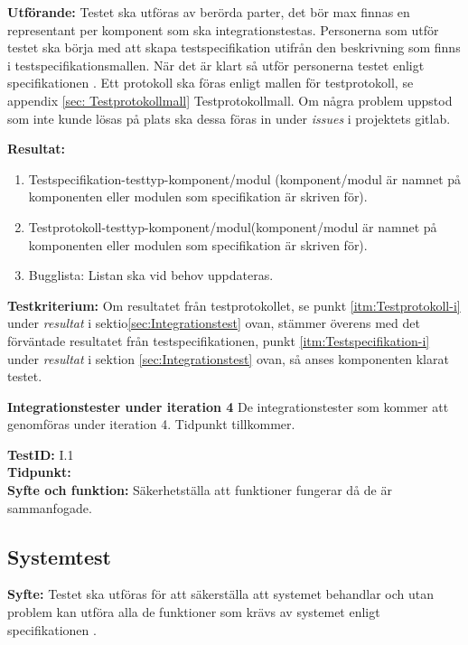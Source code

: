 \documentclass[a4paper,10pt, twoside]{article}
\begin{document}
\textbf{Utförande:}
Testet ska utföras av berörda parter, det bör max finnas en representant per komponent som ska integrationstestas. Personerna som utför testet ska börja med att skapa testspecifikation utifrån den beskrivning som finns i testspecifikationsmallen. När det är klart så utför personerna testet enligt specifikationen \cite{kravspec}. Ett protokoll ska föras enligt mallen för testprotokoll, se appendix \ref{sec: Testprotokollmall} Testprotokollmall. Om några problem uppstod som inte kunde lösas på plats ska dessa föras in under \emph{issues} i projektets gitlab.

\textbf{Resultat:}
\begin{enumerate}
	\item \label{itm:Testspecifikation-i} Testspecifikation-testtyp-komponent/modul (komponent/modul är namnet på 			 		  komponenten eller modulen som specifikation är skriven för).
    \item \label{itm:Testprotokoll-i} Testprotokoll-testtyp-komponent/modul(komponent/modul är namnet på komponenten eller 		  modulen som specifikation är skriven för).
    \item Bugglista: Listan ska vid behov uppdateras.
\end{enumerate}

\textbf{Testkriterium:}
Om resultatet från testprotokollet, se punkt \ref{itm:Testprotokoll-i} under \emph{resultat} i sektio\ref{sec:Integrationstest} ovan, stämmer överens med det förväntade resultatet från testspecifikationen, punkt \ref{itm:Testspecifikation-i} under \emph{resultat} i sektion \ref{sec:Integrationstest} ovan, så anses komponenten klarat testet.

\textbf{Integrationstester under iteration 4}
De integrationstester som kommer att genomföras under iteration 4. Tidpunkt tillkommer.

\textbf{TestID:} I.1
\\ \textbf{Tidpunkt:}
\\ \textbf{Syfte och funktion:} Säkerhetställa att funktioner fungerar då de är sammanfogade.  


\subsection{Systemtest}
\label{sec:Systemtest}
\textbf{Syfte:} Testet ska utföras för att säkerställa att systemet behandlar och utan problem kan utföra alla de funktioner som krävs av systemet enligt specifikationen \cite{kravspec}.
\end{document}
